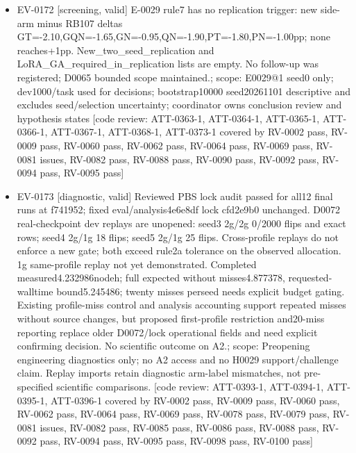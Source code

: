 \documentclass[11pt]{article}
\begin{document}
\begin{itemize}
\item EV-0172 [screening, valid] E-0029 rule7 has no replication trigger: new side-arm minus RB107 deltas GT=-2.10,GQN=-1.65,GN=-0.95,QN=-1.90,PT=-1.80,PN=-1.00pp; none reaches+1pp. New\_two\_seed\_replication and LoRA\_GA\_required\_in\_replication lists are empty. No follow-up was registered; D0065 bounded scope maintained.; scope: E0029@1 seed0 only; dev1000/task used for decisions; bootstrap10000 seed20261101 descriptive and excludes seed/selection uncertainty; coordinator owns conclusion review and hypothesis states [code review: ATT-0363-1, ATT-0364-1, ATT-0365-1, ATT-0366-1, ATT-0367-1, ATT-0368-1, ATT-0373-1 covered by RV-0002 pass, RV-0009 pass, RV-0060 pass, RV-0062 pass, RV-0064 pass, RV-0069 pass, RV-0081 issues, RV-0082 pass, RV-0088 pass, RV-0090 pass, RV-0092 pass, RV-0094 pass, RV-0095 pass]
\item EV-0173 [diagnostic, valid] Reviewed PBS lock audit passed for all12 final runs at f741952; fixed eval/analysis4e6e8df lock cfd2e9b0 unchanged. D0072 real-checkpoint dev replays are unopened: seed3 2g/2g 0/2000 flips and exact rows; seed4 2g/1g 18 flips; seed5 2g/1g 25 flips. Cross-profile replays do not enforce a new gate; both exceed rule2a tolerance on the observed allocation. 1g same-profile replay not yet demonstrated. Completed measured4.232986nodeh; full expected without misses4.877378, requested-walltime bound5.245486; twenty misses perseed needs explicit budget gating. Existing profile-miss control and analysis accounting support repeated misses without source changes, but proposed first-profile restriction and20-miss reporting replace older D0072/lock operational fields and need explicit confirming decision. No scientific outcome on A2.; scope: Preopening engineering diagnostics only; no A2 access and no H0029 support/challenge claim. Replay imports retain diagnostic arm-label mismatches, not pre-specified scientific comparisons. [code review: ATT-0393-1, ATT-0394-1, ATT-0395-1, ATT-0396-1 covered by RV-0002 pass, RV-0009 pass, RV-0060 pass, RV-0062 pass, RV-0064 pass, RV-0069 pass, RV-0078 pass, RV-0079 pass, RV-0081 issues, RV-0082 pass, RV-0085 pass, RV-0086 pass, RV-0088 pass, RV-0092 pass, RV-0094 pass, RV-0095 pass, RV-0098 pass, RV-0100 pass]

\end{itemize}
\end{document}
